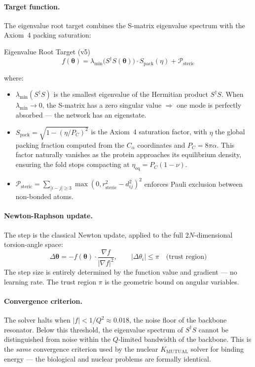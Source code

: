 \paragraph{Target function.}
The eigenvalue root target combines the S-matrix eigenvalue spectrum with the Axiom~4 packing saturation:
\begin{resultbox}{Eigenvalue Root Target (v5)}
\begin{equation}
    f(\boldsymbol{\theta}) = \lambda_{\min}\!\bigl(S^\dagger S(\boldsymbol{\theta})\bigr) \cdot S_\text{pack}(\eta) + \mathcal{P}_\text{steric}
    \label{eq:eigenvalue_target_v5}
\end{equation}
\end{resultbox}
\noindent where:
\begin{itemize}
    \item $\lambda_{\min}(S^\dagger S)$ is the smallest eigenvalue of the Hermitian product $S^\dagger S$.  When $\lambda_{\min} \to 0$, the S-matrix has a zero singular value $\Rightarrow$ one mode is perfectly absorbed — the network has an eigenstate.
    \item $S_\text{pack} = \sqrt{1 - (\eta / P_C)^2}$ is the Axiom~4 saturation factor, with $\eta$ the global packing fraction computed from the $C_\alpha$ coordinates and $P_C = 8\pi\alpha$.  This factor naturally vanishes as the protein approaches its equilibrium density, ensuring the fold stops compacting at $\eta_\text{eq} = P_C(1 - \nu)$.
    \item $\mathcal{P}_\text{steric} = \sum_{|i-j|\geq 3} \max(0, r_\text{steric}^2 - d_{ij}^2)^2$ enforces Pauli exclusion between non-bonded atoms.
\end{itemize}

\paragraph{Newton-Raphson update.}
The step is the classical Newton update, applied to the full $2N$-dimensional torsion-angle space:
\begin{equation}
    \Delta\boldsymbol{\theta} = -f(\boldsymbol{\theta}) \cdot \frac{\nabla f}{|\nabla f|^2}, \qquad |\Delta\theta_i| \leq \pi \quad\text{(trust region)}
    \label{eq:newton_update_v5}
\end{equation}
The step size is entirely determined by the function value and gradient --- no learning rate.  The trust region $\pi$ is the geometric bound on angular variables.

\paragraph{Convergence criterion.}
The solver halts when $|f| < 1/Q^2 \approx 0.018$, the noise floor of the backbone resonator.  Below this threshold, the eigenvalue spectrum of $S^\dagger S$ cannot be distinguished from noise within the $Q$-limited bandwidth of the backbone.  This is the \emph{same} convergence criterion used by the nuclear $K_\text{MUTUAL}$ solver for binding energy --- the biological and nuclear problems are formally identical.\vspace{0.5em}

